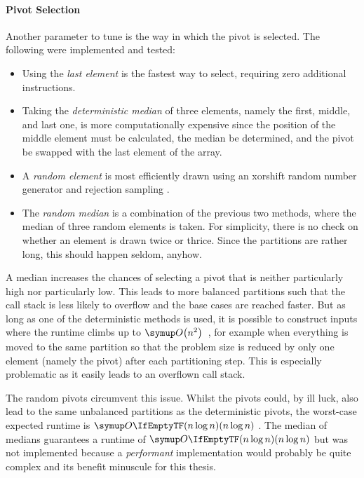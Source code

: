 \paragraph{Pivot Selection}
Another parameter to tune is the way in which the pivot is selected.
The following were implemented and tested:
\begin{itemize}
	\item
	Using the \emph{last element} is the fastest way to select, requiring zero additional instructions.

	\item
	Taking the \emph{deterministic median} of three elements, namely the first, middle, and last one, is more computationally expensive since the position of the middle element must be calculated, the median be determined, and the pivot be swapped with the last element of the array.

	\item
	A \emph{random element} is most efficiently drawn using an xorshift random number generator and rejection sampling \cite{lukas_geis}.

	\item
	The \emph{random median} is a combination of the previous two methods, where the median of three random elements is taken.
	For simplicity, there is no check on whether an element is drawn twice or thrice.
	Since the partitions are rather long, this should happen seldom, anyhow.
\end{itemize}
A median increases the chances of selecting a pivot that is neither particularly high nor particularly low.
This leads to more balanced partitions such that the call stack is less likely to overflow and the base cases are reached faster.
But as long as one of the deterministic methods is used, it is possible to construct inputs where the runtime climbs up to \(\bigoh*{n^2}\)~\cite{erkiö1984worstcase}, for example when everything is moved to the same partition so that the problem size is reduced by only one element (namely the pivot) after each partitioning step.
This is especially problematic as it easily leads to an overflown call stack.

The random pivots circumvent this issue.
Whilst the pivots could, by ill luck, also lead to the same unbalanced partitions as the deterministic pivots, the worst-case expected runtime is \(\bigoh{n \log n}\) \cite{blum2011probabilistic}.
The median of medians \cite{blum1973median} guarantees a runtime of \(\bigoh{n \log n}\) but was not implemented because a \emph{performant} implementation would probably be quite complex and its benefit minuscule for this thesis.




